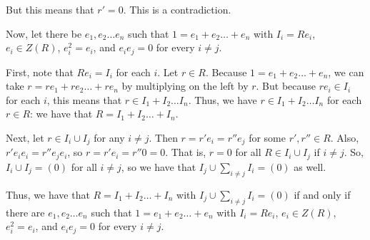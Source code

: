 \documentclass[a4paper,12pt]{article}
\newcommand{\tab}{\hspace{4mm}} %
\newcommand{\shunt}{\vspace{20mm}}
\begin{document}
\tab But this means that $r' =0$. This is a contradiction. 

Now, let there be $e_1, e_2 \ldots e_n$ such that $1 = e_1 + e_2 \ldots +e_n$ with $I_i = Re_i$, $e_i \in Z(R)$, $e_i^2 = e_i$, and $e_ie_j = 0$ for every $i \neq j$.

\tab First, note that $Re_i = I_i$ for each $i$. Let $r \in R$. Because $1 = e_1 + e_2 \ldots +e_n$, we can take $r =re_1 + re_2 \ldots + re_n$ by multiplying on the left by $r$. But because $re_i \in I_i$ for each $i$, this means that $r \in I_1 + I_2 \ldots I_n$. Thus, we have $r \in I_1 + I_2 \ldots I_n$ for each $r \in R$: we have that $R = I_1 + I_2 \ldots +I_n$.

\tab Next, let $r \in I_i \cup I_j$ for any $i \neq j$. Then $r = r'e_i=r''e_j$ for some $r',r'' \in R$. Also, $r'e_ie_i=r''e_je_i$, so $r=r'e_i = r''0=0$. That is, $r=0$ for all $R \in I_i \cup I_j$ if $i \neq j$. So, $I_i \cup I_j = (0)$ for all $i \neq j$, so we have that $I_j \cup \sum\limits_{i \neq j} I_i = (0)$ as well.

Thus, we have that $R = I_1 +I_2 \ldots + I_n$ with $I_j \cup \sum\limits_{i \neq j} I_i = (0)$ if and only if there are $e_1, e_2 \ldots e_n$ such that $1 = e_1 + e_2 \ldots +e_n$ with $I_i = Re_i$, $e_i \in Z(R)$, $e_i^2 = e_i$, and $e_ie_j = 0$ for every $i \neq j$.

\shunt
\end{document}
